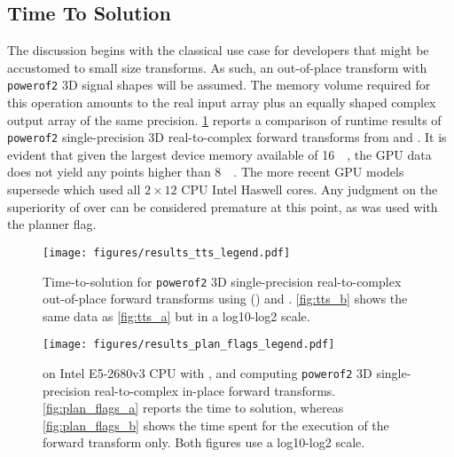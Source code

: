 \subsection{Time To Solution}
\label{ssec:tts}

The discussion begins with the classical use case for developers that might be accustomed to small size transforms. As such, an out-of-place transform with \texttt{powerof2} 3D signal shapes will be assumed. The memory volume required for this operation amounts to the real input array plus an equally shaped complex output array of the same precision.
\cref{fig:tts} reports a comparison of runtime results of \texttt{powerof2} single-precision 3D real-to-complex forward transforms from \fftw{} and \cufft{}. It is evident that given the largest device memory available of  \SI{16}{\gibi\byte}, the GPU data does not yield any points higher than \SI{8}{\gibi\byte}. The more recent GPU models supersede \fftw{} which used all $2{\times}12$ CPU Intel Haswell cores. Any judgment on the superiority of \cufft{} over \fftw{} can be considered premature at this point, as \fftw{} was used with the  planner flag.

\begin{figure}[!htbp]
  \centering
  \texttt{[image: figures/results\_tts\_legend.pdf]}\vspace{-1em}
  \hfill
  \caption{Time-to-solution for \texttt{powerof2} 3D single-precision real-to-complex out-of-place forward transforms using \fftw{} () and \cufft{}. \cref{fig:tts_b} shows the same data as \cref{fig:tts_a} but in a log10-log2 scale.}
  \label{fig:tts}
\end{figure}

\begin{figure}[!htbp]
  \centering
  \texttt{[image: figures/results\_plan\_flags\_legend.pdf]}\vspace{-1em}
  \hfill
  \caption{\fftw{} on Intel E5-2680v3 CPU with ,  and  computing \texttt{powerof2} 3D single-precision real-to-complex in-place forward transforms. \cref{fig:plan_flags_a} reports the time to solution, whereas \cref{fig:plan_flags_b} shows the time spent for the execution of the forward transform only. Both figures use a log10-log2 scale.}
  \label{fig:fftw_plan_flags}
\end{figure}

